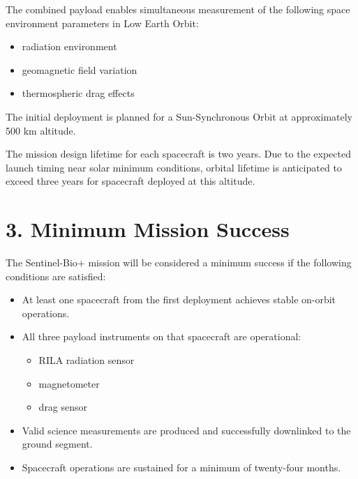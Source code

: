 \documentclass[11pt]{article}
\begin{document}
The combined payload enables simultaneous measurement of the following space environment parameters in Low Earth Orbit:

\begin{itemize}

\item radiation environment

\item geomagnetic field variation

\item thermospheric drag effects

\end{itemize}

The initial deployment is planned for a Sun-Synchronous Orbit at approximately 500 km altitude.

The mission design lifetime for each spacecraft is two years. Due to the expected launch timing near solar minimum conditions, orbital lifetime is anticipated to exceed three years for spacecraft deployed at this altitude.

\section*{3. Minimum Mission Success}

The Sentinel-Bio+ mission will be considered a minimum success if the following conditions are satisfied:

\begin{itemize}

\item At least one spacecraft from the first deployment achieves stable on-orbit operations.

\item All three payload instruments on that spacecraft are operational:

\begin{itemize}

\item RILA radiation sensor

\item magnetometer

\item drag sensor

\end{itemize}

\item Valid science measurements are produced and successfully downlinked to the ground segment.

\item Spacecraft operations are sustained for a minimum of twenty-four months.

\end{itemize}
\end{document}
